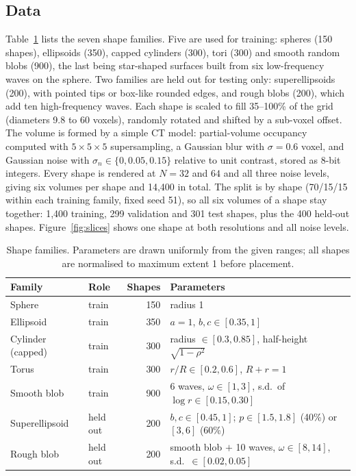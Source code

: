 \subsection{Data}
Table~\ref{tab:families} lists the seven shape families. Five are used for training: spheres (150 shapes), ellipsoids (350), capped cylinders
(300), tori (300) and smooth random blobs (900), the last being star-shaped surfaces built from six
low-frequency waves on the sphere. Two families are held out for testing only: superellipsoids (200),
with pointed tips or box-like rounded edges, and rough blobs (200), which add ten high-frequency waves.
Each shape is scaled to fill 35--100\% of the grid (diameters 9.8 to 60 voxels), randomly rotated and
shifted by a sub-voxel offset. The volume is formed by a simple CT model: partial-volume occupancy
computed with $5\times5\times5$ supersampling, a Gaussian blur with $\sigma=0.6$ voxel, and Gaussian noise
with $\sigma_n\in\{0, 0.05, 0.15\}$ relative to unit contrast, stored as 8-bit integers. Every shape is
rendered at $N=32$ and $64$ and all three noise levels, giving six volumes per shape and 14,400 in total.
The split is by shape (70/15/15 within each training family, fixed seed 51), so all six volumes of a
shape stay together: 1,400 training, 299 validation and 301 test shapes, plus the 400 held-out shapes.
Figure~\ref{fig:slices} shows one shape at both resolutions and all noise levels.

\begin{table}[t]
  \centering\small
  \caption{Shape families. Parameters are drawn uniformly from the given ranges; all shapes are
  normalised to maximum extent 1 before placement.}
  \label{tab:families}
  \begin{tabular}{llrl}
    \toprule
    Family & Role & Shapes & Parameters \\
    \midrule
    Sphere & train & 150 & radius 1 \\
    Ellipsoid & train & 350 & $a=1$, $b,c\in[0.35,1]$ \\
    Cylinder (capped) & train & 300 & radius $\in[0.3,0.85]$, half-height $\sqrt{1-\rho^2}$ \\
    Torus & train & 300 & $r/R\in[0.2,0.6]$, $R+r=1$ \\
    Smooth blob & train & 900 & 6 waves, $\omega\in[1,3]$, s.d.\ of $\log r\in[0.15,0.30]$ \\
    \midrule
    Superellipsoid & held out & 200 & $b,c\in[0.45,1]$; $p\in[1.5,1.8]$ (40\%) or $[3,6]$ (60\%) \\
    Rough blob & held out & 200 & smooth blob $+$ 10 waves, $\omega\in[8,14]$, s.d.\ $\in[0.02,0.05]$ \\
    \bottomrule
  \end{tabular}
\end{table}

